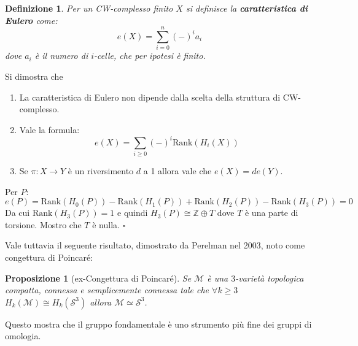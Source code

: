 \documentclass[10pt, twoside=false, x11names]{scrbook}
\newtheorem{proposition}[theorem]{Proposizione}
\newtheorem{definition}[theorem]{Definizione}
\newenvironment{proof}{{\textbf{Dimostrazione}:}}{\hfill $\square$}
\newcommand{\M}{\mathcal{M}}
\newcommand{\Z}{\mathbb{Z}}
\newcommand{\rank}[1]{\mathrm{Rank}( #1 )}
\newcommand{\Sph}[1][]{\mathcal{S}^#1}
\begin{document}
\begin{proof}
  \begin{definition}
    Per un CW-complesso finito $ X $ si definisce la \textbf{caratteristica di Eulero}
    come:
    \[
      e(X) = \sum_{i = 0}^n (-)^i a_i
    \]
    dove $ a_i $ è il numero di $ i $-celle, che per ipotesi è finito.
  \end{definition}
  Si dimostra che
  \begin{enumerate}
  \item La caratteristica di Eulero non dipende dalla scelta della struttura
    di CW-complesso.
  \item Vale la formula:
    \[
      e(X) = \sum_{i\geq0}(-)^i \rank{H_i(X)}
    \]
  \item Se $ \pi \colon X \to Y $ è un riversimento $ d $ a 1 allora vale che $ e(X) = d e(Y) $.
  \end{enumerate}
  Per $ P $:
  \[
    e(P) = \rank{H_0(P)} - \rank{H_1(P)} + \rank{H_2(P)} - \rank{H_3(P)} = 0
  \]
  Da cui $ \rank{H_3(P)} = 1 $ e quindi $ H_3(P) \cong \Z \oplus T $ dove $ T $ è una parte
  di torsione. Mostro che $ T $ è nulla.
\end{proof}

Vale tuttavia il seguente risultato, dimostrato da Perelman nel 2003,
noto come congettura di Poincaré:
\begin{proposition}[ex-Congettura di Poincaré]
  Se $ \M $ è una $ 3 $-varietà topologica compatta, connessa e semplicemente
  connessa tale che $ \forall k \geq 3 $ $ H_k(\M) \cong H_k(\Sph{3}) $ allora $ \M \simeq \Sph{3} $.
\end{proposition}
Questo mostra che il gruppo fondamentale è uno strumento più fine
dei gruppi di omologia.



\end{document}
